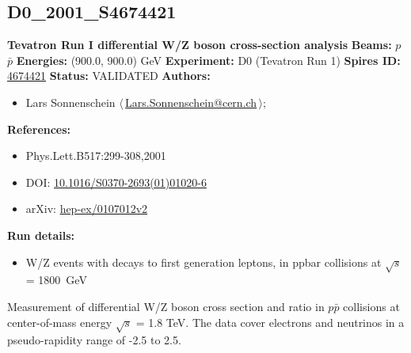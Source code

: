 \subsection[D0\_2001\_S4674421]{D0\_2001\_S4674421\,\cite{Abazov:2001nta}}
\textbf{Tevatron Run I differential W/Z boson cross-section analysis}\newline
\textbf{Beams:} $p$\,$\bar{p}$ \newline
\textbf{Energies:} (900.0, 900.0) GeV \newline
\textbf{Experiment:} D0 (Tevatron Run 1) \newline
\textbf{Spires ID:} \href{http://www.slac.stanford.edu/spires/find/hep/www?rawcmd=key+4674421}{4674421}\newline
\textbf{Status:} VALIDATED\newline
\textbf{Authors:}
\begin{itemize}
  \item Lars Sonnenschein $\langle\,$\href{mailto:Lars.Sonnenschein@cern.ch}{Lars.Sonnenschein@cern.ch}$\,\rangle$;
\end{itemize}
\textbf{References:}
\begin{itemize}
  \item Phys.Lett.B517:299-308,2001
  \item DOI: \href{http://dx.doi.org/10.1016/S0370-2693(01)01020-6}{10.1016/S0370-2693(01)01020-6}
  \item arXiv: \href{http://arxiv.org/abs/hep-ex/0107012v2}{hep-ex/0107012v2}
\end{itemize}
\textbf{Run details:}
\begin{itemize}

  \item W/Z events with decays to first generation leptons, in ppbar collisions at \ensuremath{\sqrt{s}} = 1800~GeV\end{itemize}

\noindent Measurement of differential W/Z boson cross section and ratio in $p \bar{p}$ collisions at center-of-mass energy \ensuremath{\sqrt{s}} = 1.8 TeV. The data cover electrons and neutrinos in a pseudo-rapidity range of -2.5 to 2.5.

\clearpage


\clearpage

